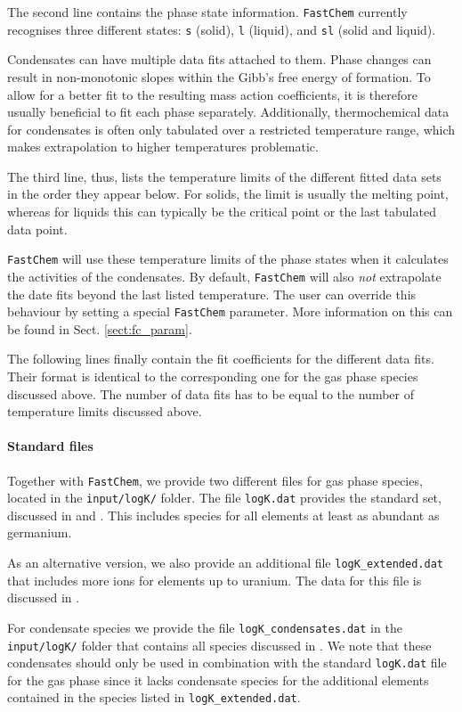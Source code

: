 \documentclass[numbers=noenddot]{aux/fcmanual}
\newcommand{\fc}{\texttt{FastChem}\xspace}
\begin{document}
The second line contains the phase state information. \fc currently recognises three different states:  \verb|s| (solid),  \verb|l| (liquid), and  \verb|sl| (solid and liquid).

Condensates can have multiple data fits attached to them. Phase changes can result in non-monotonic slopes within the Gibb's free energy of formation. To allow for a better fit to the resulting mass action coefficients, it is therefore usually beneficial to fit each phase separately. Additionally, thermochemical data for condensates is often only tabulated over a restricted temperature range, which makes extrapolation to higher temperatures problematic.  

The third line, thus, lists the temperature limits of the different fitted data sets in the order they appear below. For solids, the limit is usually the melting point, whereas for liquids this can typically be the critical point or the last tabulated data point. 

\fc will use these temperature limits of the phase states when it calculates the activities of the condensates. By default, \fc will also \textit{not} extrapolate the date fits beyond the last listed temperature. The user can override this behaviour by setting a special \fc parameter. More information on this can be found in Sect. \ref{sect:fc_param}.

The following lines finally contain the fit coefficients for the different data fits. Their format is identical to the corresponding one for the gas phase species discussed above. The number of data fits has to be equal to the number of temperature limits discussed above.

\paragraph{Standard files}
Together with \fc, we provide two different files for gas phase species, located in the \verb|input/logK/| folder. The file \verb|logK.dat| provides the standard set, discussed in \citet{Stock2018MNRAS.479..865S} and \citet{Stock2022MNRAS.517.4070S}. This includes species for all elements at least as abundant as germanium.

As an alternative version, we also provide an additional file \verb|logK_extended.dat| that includes more ions for elements up to uranium. The data for this file is discussed in \citet{Hoeijmakers2019A&A...627A.165H}.

For condensate species we provide the file \verb|logK_condensates.dat| in the \verb|input/logK/| folder that contains all species discussed in \citet{Kitzmann2023inprep}. We note that these condensates should only be used in combination with the standard \verb|logK.dat| file for the gas phase since it lacks condensate species for the additional elements contained in the species listed in \verb|logK_extended.dat|.
\end{document}
